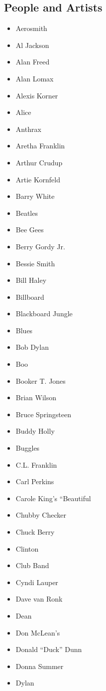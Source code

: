 \documentclass[12pt,a4paper]{article}
\begin{document}
\subsection{People and Artists}
\begin{itemize}
  \item Aerosmith
  \item Al Jackson
  \item Alan Freed
  \item Alan Lomax
  \item Alexis Korner
  \item Alice
  \item Anthrax
  \item Aretha Franklin
  \item Arthur Crudup
  \item Artie Kornfeld
  \item Barry White
  \item Beatles
  \item Bee Gees
  \item Berry Gordy Jr.
  \item Bessie Smith
  \item Bill Haley
  \item Billboard
  \item Blackboard Jungle
  \item Blues
  \item Bob Dylan
  \item Boo
  \item Booker T. Jones
  \item Brian Wilson
  \item Bruce Springsteen
  \item Buddy Holly
  \item Buggles
  \item C.L. Franklin
  \item Carl Perkins
  \item Carole King's ``Beautiful
  \item Chubby Checker
  \item Chuck Berry
  \item Clinton
  \item Club Band
  \item Cyndi Lauper
  \item Dave van Ronk
  \item Dean
  \item Don McLean's
  \item Donald ``Duck'' Dunn
  \item Donna Summer
  \item Dylan

\end{itemize}
\end{document}

